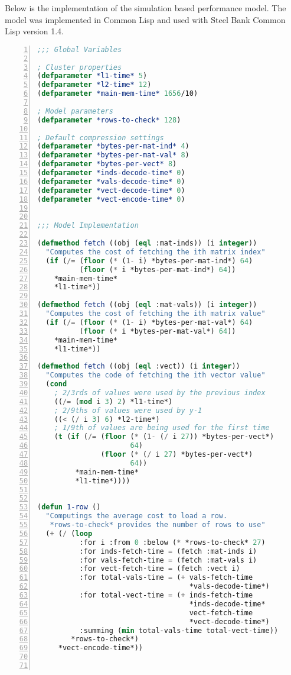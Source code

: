 Below is the implementation of the simulation based performance model.
The model was implemented in Common Lisp and used with Steel Bank Common Lisp version 1.4.

\begin{lstlisting}[language=Lisp,
					showstringspaces=false,
					numbers=left,
					numberstyle=\tiny]
;;; Global Variables

; Cluster properties
(defparameter *l1-time* 5)
(defparameter *l2-time* 12)
(defparameter *main-mem-time* 1656/10)

; Model parameters
(defparameter *rows-to-check* 128)

; Default compression settings
(defparameter *bytes-per-mat-ind* 4)
(defparameter *bytes-per-mat-val* 8)
(defparameter *bytes-per-vect* 8)
(defparameter *inds-decode-time* 0)
(defparameter *vals-decode-time* 0)
(defparameter *vect-decode-time* 0)
(defparameter *vect-encode-time* 0)


;;; Model Implementation

(defmethod fetch ((obj (eql :mat-inds)) (i integer))
  "Computes the cost of fetching the ith matrix index"
  (if (/= (floor (* (1- i) *bytes-per-mat-ind*) 64)
          (floor (* i *bytes-per-mat-ind*) 64))
    *main-mem-time*
    *l1-time*))

(defmethod fetch ((obj (eql :mat-vals)) (i integer))
  "Computes the cost of fetching the ith matrix value"
  (if (/= (floor (* (1- i) *bytes-per-mat-val*) 64)
          (floor (* i *bytes-per-mat-val*) 64))
    *main-mem-time*
    *l1-time*))

(defmethod fetch ((obj (eql :vect)) (i integer))
  "Computes the code of fetching the ith vector value"
  (cond
    ; 2/3rds of values were used by the previous index
    ((/= (mod i 3) 2) *l1-time*)
    ; 2/9ths of values were used by y-1
    ((< (/ i 3) 6) *l2-time*)
    ; 1/9th of values are being used for the first time
    (t (if (/= (floor (* (1- (/ i 27)) *bytes-per-vect*)
                      64)
               (floor (* (/ i 27) *bytes-per-vect*)
                      64))
         *main-mem-time*
         *l1-time*))))


(defun 1-row ()
  "Computings the average cost to load a row.
   *rows-to-check* provides the number of rows to use"
  (+ (/ (loop
          :for i :from 0 :below (* *rows-to-check* 27)
          :for inds-fetch-time = (fetch :mat-inds i)
          :for vals-fetch-time = (fetch :mat-vals i)
          :for vect-fetch-time = (fetch :vect i)
          :for total-vals-time = (+ vals-fetch-time
                                    *vals-decode-time*)
          :for total-vect-time = (+ inds-fetch-time
                                    *inds-decode-time*
                                    vect-fetch-time
                                    *vect-decode-time*)
          :summing (min total-vals-time total-vect-time))
        *rows-to-check*)
     *vect-encode-time*))



\end{lstlisting}
